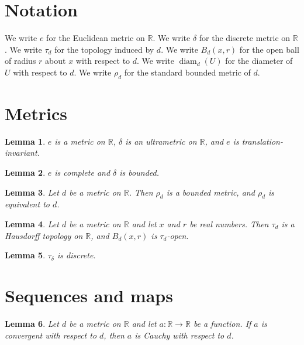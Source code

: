 \documentclass{article}
\newtheorem{lemma}{Lemma}
\begin{document}
\section{Notation}

We write $e$ for the Euclidean metric on $\mathbb{R}$.
We write $\delta$ for the discrete metric on $\mathbb{R}$.
We write $\tau_d$ for the topology induced by $d$.
We write $B_d(x,r)$ for the open ball of radius $r$ about $x$ with respect to $d$.
We write $\operatorname{diam}_d(U)$ for the diameter of $U$ with respect to $d$.
We write $\rho_d$ for the standard bounded metric of $d$.

\section{Metrics}

\begin{lemma}\label{metrics}
$e$ is a metric on $\mathbb{R}$, $\delta$ is an ultrametric on $\mathbb{R}$, and $e$ is translation-invariant.
\end{lemma}

\begin{lemma}\label{complete}
$e$ is complete and $\delta$ is bounded.
\end{lemma}

\begin{lemma}\label{bounded}
Let $d$ be a metric on $\mathbb{R}$. Then $\rho_d$ is a bounded metric, and $\rho_d$ is equivalent to $d$.
\end{lemma}

\begin{lemma}\label{induced}
Let $d$ be a metric on $\mathbb{R}$ and let $x$ and $r$ be real numbers. Then $\tau_d$ is a Hausdorff topology on $\mathbb{R}$, and $B_d(x,r)$ is $\tau_d$-open.
\end{lemma}

\begin{lemma}\label{discrete}
$\tau_\delta$ is discrete.
\end{lemma}

\section{Sequences and maps}

\begin{lemma}\label{cauchy}
Let $d$ be a metric on $\mathbb{R}$ and let $a:\mathbb{R}\to\mathbb{R}$ be a function. If $a$ is convergent with respect to $d$, then $a$ is Cauchy with respect to $d$.
\end{lemma}
\end{document}
